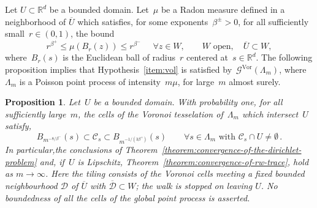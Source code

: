 \documentclass[12pt]{amsart}
\numberwithin{equation}{section}
\newtheorem{prop}[theorem]{Proposition}
\newcommand*{\Rd}{\ensuremath{\mathbb{R}^d}}
\newcommand{\GVor}{\mathcal{G}^{\mathrm{Vor}}}
\begin{document}
Let $U\subset \Rd$ be a bounded domain. Let~$\mu$ be a Radon measure defined in a neighborhood of $\overline U$
which satisfies, for some exponents~$\beta^{\pm} > 0$, for all sufficiently small~$r \in (0,1)$, the bound 
\begin{equation}
	\label{eq:holder-assumption}
	r^{\beta^{+}} \leq \mu(B_r(z)) \leq r^{\beta^{-}} \,  \ 
\quad \forall z \in W ,\qquad W\text{ open},\quad\overline U\subset W , 
\end{equation}
	where~$B_r(s)$ is the Euclidean ball of radius~$r$ centered at~$s \in \Rd$. 
The following proposition implies that Hypothesis~\ref{item:vol} is satisfied  by~$\GVor(\Lambda_m)$,
where~$\Lambda_m$ is a Poisson point process of intensity~$m \mu$, for large~$m$ almost surely.
\begin{prop}
	\label{prop:min-max-edge-length}
	Let~$U$ be a bounded domain.
	With probability one, for all sufficiently large~$m$, the cells of the Voronoi tesselation of~$\Lambda_m$
	which intersect~$U$ satisfy, 
	\begin{equation}
		\label{eq:cells-are-contained-in-balls}
	B_{m^{-8/\beta^-}}(s) \subset \mathcal{C}_s \subset B_{m^{-1/(3\beta^+)}}(s) \qquad \forall s \in \Lambda_m  \mbox{ with~$\mathcal{C}_s \cap U \neq \emptyset$} \, .
	\end{equation}
	In particular,the conclusions of Theorem~\ref{theorem:convergence-of-the-dirichlet-problem} and, if~$U$ is Lipschitz, Theorem~\ref{theorem:convergence-of-rw-trace}, hold as $m\to\infty$. Here the tiling consists of the Voronoi cells meeting a fixed bounded neighbourhood $\mathcal D$ of $\overline U$ with $\overline{\mathcal D}\subset W$; the walk is stopped on leaving $U$. No boundedness of all the cells of the global point process is asserted.
\end{prop}
\end{document}
